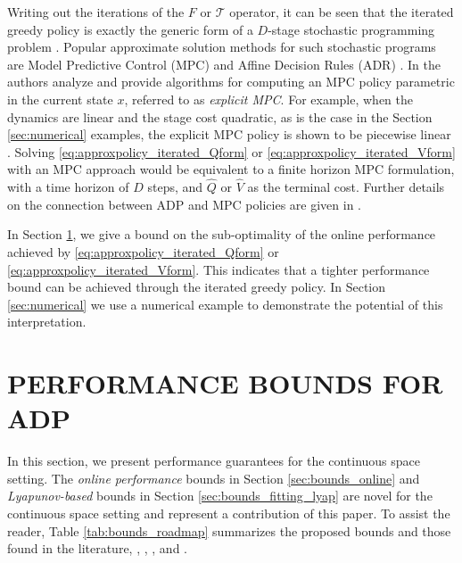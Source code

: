 \documentclass[journal]{IEEEtran}
\newcommand{\mcal}{\mathcal}
\begin{document}
Writing out the iterations of the $F$ or $\mcal{T}$ operator, it can be seen that the iterated greedy policy is exactly the generic form of a $D$-stage stochastic programming problem \cite[section 3.1]{shapiro_2014_lectures_on_stoch_prog}.
Popular approximate solution methods for such stochastic programs are Model Predictive Control (MPC) \cite{rawlings_1999_MPCtextbook,camacho_2007_MPC} and Affine Decision Rules (ADR) \cite{ben-tal_adjustable_2004,angelos_2010_generalizedDR}.
In \cite{morari_2014_MPCBook} the authors analyze and provide algorithms for computing an MPC policy parametric in the current state $x$, referred to as \emph{explicit MPC}. For example, when the dynamics are linear and the stage cost quadratic, as is the case in the Section \ref{sec:numerical} examples, the explicit MPC policy is shown to be piecewise linear \cite[\S 6.3]{morari_2014_MPCBook}.
Solving  \eqref{eq:approxpolicy_iterated_Qform} or \eqref{eq:approxpolicy_iterated_Vform} with an MPC approach would be equivalent to a finite horizon MPC formulation, with a time horizon of $D$ steps, and $\hat{Q}$ or $\hat{V}$ as the terminal cost.
Further details on the connection between ADP and MPC policies are given in \cite{bertsekas_2005_fromADPtoMPC}.


In Section \ref{sec:bounds}, we give a bound on the sub-optimality of the online performance achieved by \eqref{eq:approxpolicy_iterated_Qform} or \eqref{eq:approxpolicy_iterated_Vform}. This indicates that a tighter performance bound can be achieved through the iterated greedy policy. In Section \ref{sec:numerical} we use a numerical example to demonstrate the potential of this interpretation. 




\section{PERFORMANCE BOUNDS FOR ADP} \label{sec:bounds}

In this section, we present performance guarantees for the continuous space setting. The \emph{online performance} bounds in Section \ref{sec:bounds_online} and \emph{Lyapunov-based} bounds in Section \ref{sec:bounds_fitting_lyap} are novel for the continuous space setting and represent a contribution of this paper.
To assist the reader, Table \ref{tab:bounds_roadmap} summarizes the proposed bounds and those found in the literature, \cite{vanRoy_linApproxDP}, \cite{vanroy_decentADP}, \cite{beuchat_2016_ECC_PWMQ}, and \cite{boyd_iteratedBellman}.
\end{document}
